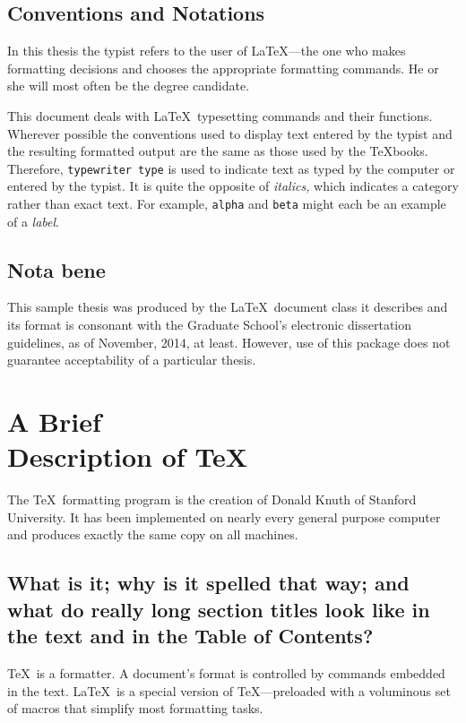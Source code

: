 \documentclass [11pt, proquest] {uwthesis}[2020/02/24]
\begin{document}
 
\section{Conventions and Notations}
 
In this thesis the typist
refers to the user of \LaTeX---the one who
makes formatting decisions and chooses the appropriate
formatting commands.
He or she will most often be the degree candidate.
 
This document deals with \LaTeX\ typesetting commands and their
functions.  Wherever possible the conventions used to display
text entered by the typist and the resulting formatted output
are the same as those used by the \TeX books.
Therefore, {\tt typewriter type} is used to indicate text
as typed by the computer
or entered by the typist.
It is quite the opposite of {\it italics,} which indicates
a category rather than exact text.  For example,
{\tt alpha} and {\tt beta} might each be an example of a {\it label}.
 
 
\section{Nota bene}
 
This sample thesis was produced by the \LaTeX\ document class it describes
and its format is consonant with the Graduate School's electronic dissertation guidelines,
as of November, 2014, at least.
However, use of this package does not guarantee acceptability
of a particular thesis.
 
 
 
\chapter{A Brief \\ Description of \protect\TeX}
 
The \TeX\ formatting program is the creation of
Donald Knuth of Stanford University.
It has been implemented on nearly every general purpose computer and
produces exactly the same copy on all machines.
 
\section{What is it; why is it spelled that way; 
and what do
really long section titles look like in the text and in the
Table of Contents?}
 
\TeX\ is a formatter.  A document's format is controlled
by commands embedded in the text.  
\LaTeX\ is a special version of \TeX---preloaded
with a voluminous set of macros that simplify most
formatting tasks.
 
\end{document}
